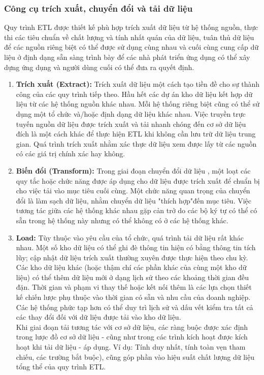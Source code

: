 \subsubsection{Công cụ trích xuất, chuyển đổi và tải dữ liệu}
Quy trình ETL được thiết kế phù hợp trích xuất dữ liệu từ hệ thống nguồn, thực thi các tiêu chuẩn về chất lượng và tính nhất quán của dữ liệu, tuân thủ dữ liệu để các nguồn riêng biệt có thể được sử dụng cùng nhau và cuối cùng cung cấp dữ liệu ở định dạng sẵn sàng trình bày để
các nhà phát triển ứng dụng có thể xây dựng ứng dụng và người dùng cuối có thể đưa ra quyết định.
\begin{enumerate}
    \item \textbf{Trích xuất (Extract):}
    Trích xuất dữ liệu một cách tạo tiền đề cho sự thành công của các
    quy trình tiếp theo. Hầu hết các dự án kho dữ liệu kết hợp dữ liệu từ các hệ thống nguồn khác nhau. Mỗi hệ thống riêng biệt cũng có thể sử dụng một tổ chức và/hoặc định dạng dữ liệu khác nhau. Việc truyền trực tuyến nguồn dữ liệu được trích xuất và tải nhanh chóng
    đến cơ sở dữ liệu đích là một cách khác để thực hiện ETL khi không cần lưu trữ dữ liệu trung gian. Quá trình trích xuất nhằm xác thực dữ liệu xem được lấy từ các nguồn có các giá trị chính xác hay không.
    \item \textbf{Biến đổi (Transform):}
    Trong giai đoạn chuyển đổi dữ liệu , một loạt các quy tắc hoặc chức năng được áp dụng cho dữ liệu được trích xuất để chuẩn bị cho việc tải vào mục tiêu cuối cùng. Một chức năng quan trọng của chuyển đổi là làm sạch dữ liệu, nhằm chuyển dữ liệu "thích hợp"đến mục tiêu. Việc tương tác giữa các hệ thống khác nhau gặp cản trở do các bộ ký tự có thể có sẵn trong hệ thống này nhưng có thể không có ở các hệ thống khác.
    \item \textbf{Load:}
    Tùy thuộc vào yêu cầu của tổ chức, quá trình tải dữ liệu rất khác nhau. Một số kho dữ liệu có thể ghi đè thông tin hiện có bằng thông tin tích lũy; cập nhật dữ liệu trích xuất thường xuyên được thực hiện theo chu kỳ. Các kho dữ liệu khác (hoặc thậm chí các phần khác của cùng một kho dữ liệu) có thể thêm dữ liệu mới ở dạng lịch sử theo các khoảng thời gian đều đặn. Thời gian và phạm vi thay thế hoặc kết nối thêm là các lựa chọn thiết kế chiến lược phụ thuộc vào thời gian có sẵn và nhu cầu của doanh nghiệp. Các hệ thống phức tạp hơn có thể duy trì lịch sử và dấu vết kiểm tra tất cả các thay đổi đối với dữ liệu được tải vào kho dữ liệu.\\
    Khi giai đoạn tải tương tác với cơ sở dữ liệu, các ràng buộc được xác định trong lược đồ cơ sở dữ liệu - cũng như trong các trình kích hoạt được kích hoạt khi tải dữ liệu - áp dụng. Ví dụ: Tính duy nhất, tính toàn vẹn tham chiếu, các trường bắt buộc), cũng góp phần vào hiệu suất chất lượng dữ liệu tổng thể của quy trình ETL.
\end{enumerate}
